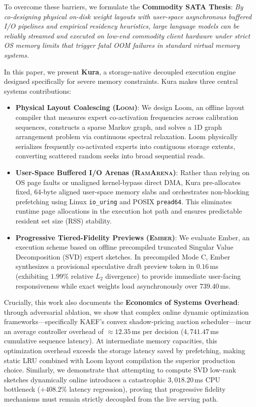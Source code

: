 To overcome these barriers, we formulate the \textbf{Commodity SATA Thesis}: \emph{By co-designing physical on-disk weight layouts with user-space asynchronous buffered I/O pipelines and empirical residency heuristics, large language models can be reliably streamed and executed on low-end commodity client hardware under strict OS memory limits that trigger fatal OOM failures in standard virtual memory systems.}

In this paper, we present \textbf{Kura}, a storage-native decoupled execution engine designed specifically for severe memory constraints. Kura makes three central systems contributions:
\begin{itemize}
    \item \textbf{Physical Layout Coalescing (\textsc{Loom})}: We design Loom, an offline layout compiler that measures expert co-activation frequencies across calibration sequences, constructs a sparse Markov graph, and solves a 1D graph arrangement problem via continuous spectral relaxation. Loom physically serializes frequently co-activated experts into contiguous storage extents, converting scattered random seeks into broad sequential reads.
    \item \textbf{User-Space Buffered I/O Arenas (\textsc{RamArena})}: Rather than relying on OS page faults or unaligned kernel-bypass direct DMA, Kura pre-allocates fixed, 64-byte aligned user-space memory slabs and orchestrates non-blocking prefetching using Linux \texttt{io\_uring} and POSIX \texttt{pread64}. This eliminates runtime page allocations in the execution hot path and ensures predictable resident set size (RSS) stability.
    \item \textbf{Progressive Tiered-Fidelity Previews (\textsc{Ember})}: We evaluate Ember, an execution scheme based on offline precompiled truncated Singular Value Decomposition (SVD) expert sketches. In precompiled Mode C, Ember synthesizes a provisional speculative draft preview token in $0.16$\,ms (exhibiting $1.99\%$ relative $L_2$ divergence) to provide immediate user-facing responsiveness while exact weights load asynchronously over $739.40$\,ms.
\end{itemize}

Crucially, this work also documents the \textbf{Economics of Systems Overhead}: through adversarial ablation, we show that complex online dynamic optimization frameworks—specifically KAEF's convex shadow-pricing auction scheduler—incur an average controller overhead of $\approx 12.35$\,ms per decision ($4,741.47$\,ms cumulative sequence latency). At intermediate memory capacities, this optimization overhead exceeds the storage latency saved by prefetching, making static LRU combined with Loom layout compilation the superior production choice. Similarly, we demonstrate that attempting to compute SVD low-rank sketches dynamically online introduces a catastrophic $3,018.20$\,ms CPU bottleneck ($+408.2\%$ latency regression), proving that progressive fidelity mechanisms must remain strictly decoupled from the live serving path.
